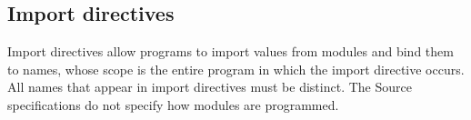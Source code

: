 \subsection*{Import directives}

Import directives allow programs to import values from modules and bind them to names, whose scope
is the entire program in which the import directive occurs. All names that appear in import directives
must be distinct. The Source specifications do not specify how modules are programmed.
